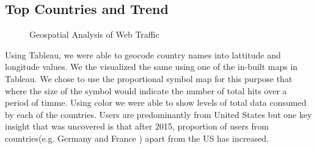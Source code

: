 \subsection{Top Countries and Trend} \label{vizcountries}
 

\begin{figure}
\centering
{}
\caption{Geospatial Analysis of Web Traffic}
\label{fig:TopCountries}
\end{figure}

Using Tableau, we were able to geocode country names into lattitude and longitude values. We the visualized the same using one of the in-built maps in Tableau. We chose to use the proportional symbol map for this purpose that where the size of the symbol would indicate the number of total hits over a period of timme. Using color we were able to show levels of total data consumed by each of the countries. Users are predominantly from United States but one key insight that was uncovered is that after 2015, proportion of users from countries(e.g. Germany and France ) apart from the US has increased. 
